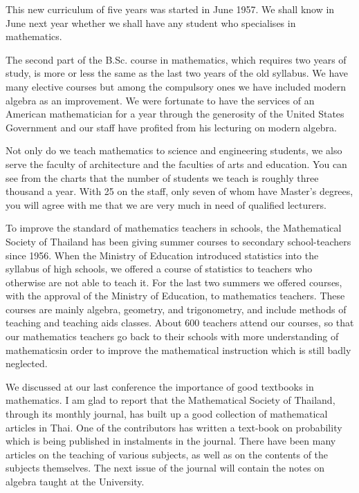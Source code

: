 This new curriculum of five years was started in June 1957. We shall know in June next year whether we shall have any student who specialises in mathematics.

The second part of the B.Sc. course in mathematics, which requires two years of study, is more or less the same as the last two years of the old syllabus. We have many elective courses but among the compulsory ones we have included modern algebra as an improvement. We were fortunate to have the services of an American mathematician for a year through the generosity of the United States Government and our staff have profited from his lecturing on modern algebra.

Not only do we teach mathematics to science and engineering students, we also serve the faculty of architecture and the faculties of arts and education. You can see from the charts that the number of students we teach is roughly three thousand a year. With 25 on the staff, only seven of whom have Master's degrees, you will agree with me that we are very much in need of qualified lecturers.

To improve the standard of mathematics teachers in schools, the Mathematical Society of Thailand has been giving summer courses to secondary school-teachers since 1956. When the Ministry of Education introduced statistics into the syllabus of high schools, we offered a course of statistics to teachers who otherwise are not able to teach it. For the last two summers we offered courses, with the approval of the Ministry of Education, to mathematics teachers. These courses are mainly algebra, geometry, and trigonometry, and include methods of teaching and teaching aids classes. About 600 teachers attend our courses, so that our mathematics teachers go back to their schools with more understanding of mathematics\pageoriginale in order to improve the mathematical instruction which is still badly neglected.

We discussed at our last conference the importance of good textbooks in mathematics. I am glad to report that the Mathematical Society of Thailand, through its monthly journal, has built up a good collection of mathematical articles in Thai. One of the contributors has written a text-book on probability which is being published in instalments in the journal. There have been many articles on the teaching of various subjects, as well as on the contents of the subjects themselves. The next issue of the journal will contain the notes on algebra taught at the University.

